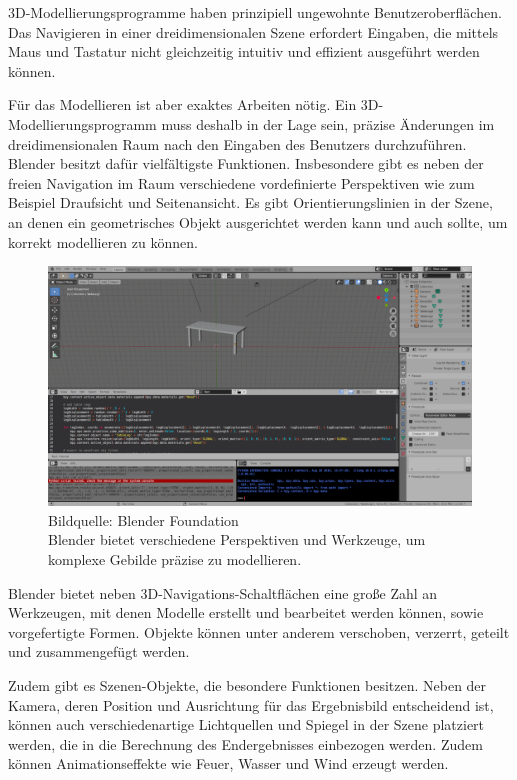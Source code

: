 3D-Modellierungsprogramme haben prinzipiell ungewohnte Benutzeroberflächen. Das Navigieren in einer dreidimensionalen Szene erfordert Eingaben, die mittels Maus und Tastatur nicht gleichzeitig intuitiv und effizient ausgeführt werden können.

Für das Modellieren ist aber exaktes Arbeiten nötig. Ein 3D-Modellierungsprogramm muss deshalb in der Lage sein, präzise Änderungen im dreidimensionalen Raum nach den Eingaben des Benutzers durchzuführen. Blender besitzt dafür vielfältigste Funktionen. Insbesondere gibt es neben der freien Navigation im Raum verschiedene vordefinierte Perspektiven wie zum Beispiel Draufsicht und Seitenansicht. Es gibt Orientierungslinien in der Szene, an denen ein geometrisches Objekt ausgerichtet werden kann und auch sollte, um korrekt modellieren zu können.

\begin{figure}[h]
	\centering
	\includegraphics[width=1\textwidth]{bilder/blender.png}

	\caption[Blender-Arbeitsbereich]{Bildquelle: Blender Foundation \\ Blender bietet verschiedene Perspektiven und Werkzeuge, um komplexe Gebilde präzise zu modellieren. }

	\label{fig:blender}
\end{figure}

Blender bietet neben 3D-Navigations-Schaltflächen eine große Zahl an Werkzeugen, mit denen Modelle erstellt und bearbeitet werden können, sowie vorgefertigte Formen. Objekte können unter anderem verschoben, verzerrt, geteilt und zusammengefügt werden.

Zudem gibt es Szenen-Objekte, die besondere Funktionen besitzen. Neben der Kamera, deren Position und Ausrichtung für das Ergebnisbild entscheidend ist, können auch verschiedenartige Lichtquellen und Spiegel in der Szene platziert werden, die in die Berechnung des Endergebnisses einbezogen werden. Zudem können Animationseffekte wie Feuer, Wasser und Wind erzeugt werden.
\pagebreak


